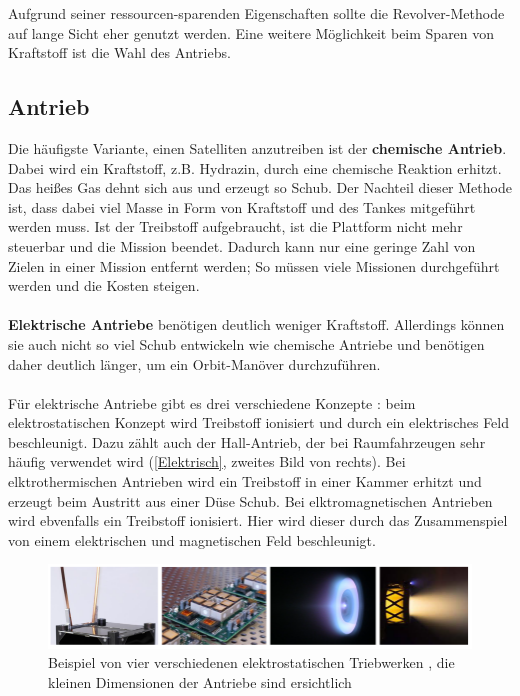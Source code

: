\documentclass{article}
\begin{document}
Aufgrund seiner ressourcen-sparenden Eigenschaften sollte die Revolver-Methode auf lange Sicht eher genutzt werden. Eine weitere Möglichkeit beim Sparen von Kraftstoff ist die Wahl des Antriebs.

\subsection{Antrieb}
Die häufigste Variante, einen Satelliten anzutreiben ist der \textbf{chemische Antrieb}. Dabei wird ein Kraftstoff, z.B. Hydrazin, durch eine chemische Reaktion erhitzt. Das heißes Gas dehnt sich aus und erzeugt so Schub. Der Nachteil dieser Methode ist, dass dabei viel Masse in Form von Kraftstoff und des Tankes mitgeführt werden muss. Ist der Treibstoff aufgebraucht, ist die Plattform nicht mehr steuerbar und die Mission beendet. Dadurch kann nur eine geringe Zahl von Zielen in einer Mission entfernt werden; So müssen viele Missionen durchgeführt werden und die Kosten steigen. \\\\
\textbf{Elektrische Antriebe} benötigen deutlich weniger Kraftstoff. Allerdings können sie auch nicht so viel Schub entwickeln wie chemische Antriebe und benötigen daher deutlich länger, um ein Orbit-Manöver durchzuführen. \\\\
Für elektrische Antriebe gibt es drei verschiedene Konzepte \citep{o2021electric}: beim elektrostatischen Konzept wird Treibstoff ionisiert und durch ein elektrisches Feld beschleunigt. Dazu zählt auch der Hall-Antrieb, der bei Raumfahrzeugen sehr häufig verwendet wird (\autoref{Elektrisch}, zweites Bild von rechts). Bei elktrothermischen Antrieben wird ein Treibstoff in einer Kammer erhitzt und erzeugt beim Austritt aus einer Düse Schub. Bei elktromagnetischen Antrieben wird ebvenfalls ein Treibstoff ionisiert. Hier wird dieser durch das Zusammenspiel von einem elektrischen und magnetischen Feld beschleunigt.
\begin{figure}[H]
	\centering
	\includegraphics[width=\linewidth]{bilder/ElecP.png}
	\caption{Beispiel von vier verschiedenen elektrostatischen Triebwerken \citep{o2021electric}, die kleinen Dimensionen der Antriebe sind ersichtlich}
	\label{Elektrisch}
\end{figure}
\end{document}
